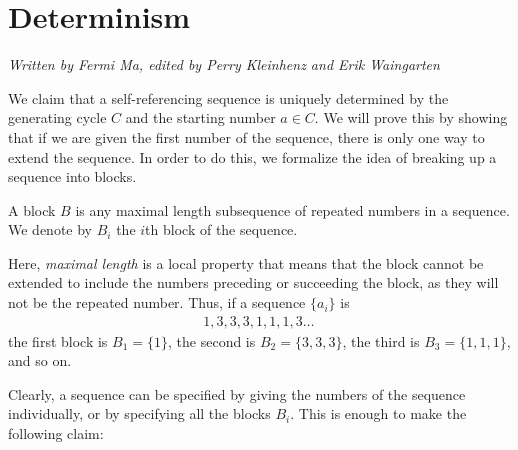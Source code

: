 \documentclass[runningheads,a4paper]{llncs}
\begin{document}
\section{Determinism}
\label{determinism}

\emph{Written by Fermi Ma, edited by Perry Kleinhenz and Erik Waingarten}

We claim that a self-referencing sequence is uniquely determined by the generating cycle $C$ and the starting number $a \in C$. We will prove this by showing that if we are given the first number of the sequence, there is only one way to extend the sequence. In order to do this, we formalize the idea of breaking up a sequence into blocks.

\begin{definition}
A block $B$ is any maximal length subsequence of repeated numbers in a sequence. We denote by $B_i$ the $i$th block of the sequence.
\end{definition}

Here, \emph{maximal length} is a local property that means that the block cannot be extended to include the numbers preceding or succeeding the block, as they will not be the repeated number. Thus, if a sequence $\{a_i\}$ is
\begin{align*}
1,3,3,3,1,1,1,3\dots \,
\end{align*}
the first block is $B_1 = \{1\}$, the second is $B_2 = \{3,3,3\}$, the third is $B_3 = \{1,1,1\}$, and so on. 

Clearly, a sequence can be specified by giving the numbers of the sequence individually, or by specifying all the blocks $B_i$. This is enough to make the following claim:
\end{document}
